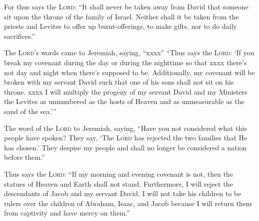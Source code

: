 \begin{inparaenum}
     For thus says the \textsc{Lord}: ``It shall never be taken away from David that someone sit upon the throne of the family of Israel.%
     Neither shall it be taken from the priests and Levites to offer up burnt-offerings, to make gifts, nor to do daily sacrifices.''%
    
     The \textsc{Lord}'s words came to Jeremiah, saying, ``xxxx''%
     ``Thus says the \textsc{Lord}: `If you break my covenant during the day or during the nighttime so that xxxx there's not day and night when there's supposed to be.%
     Additionally, my covenant will be broken with my servant David such that one of his sons shall not sit on his throne. xxxx%
     I will multiply the progeny of my servant David and my Ministers the Levites as unnumbered as the hosts of Heaven and as unmeasurable as the sand of the sea.'\thinspace''%
    
     The word of the \textsc{Lord} to Jeremiah, saying,%
     ``Have you not considered what this people have spoken? They say, `The \textsc{Lord} has rejected the two families that He has chosen.' They despise my people and shall no longer be considered a nation before them.''%
    
     Thus says the \textsc{Lord}: ``If my morning and evening covenant is not, then the statues of Heaven and Earth shall not stand.%
     Furthermore, I will reject the descendants of Jacob and my servant David. I will not take his children to be rulers over the children of Abraham, Isaac, and Jacob because I will return them from captivity and have mercy on them.''%
\end{inparaenum}
